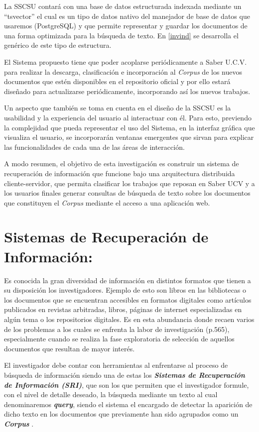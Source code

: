 \documentclass[
  10,
  spanish,
  openany]{book}
\begin{document}
La SSCSU contará con una base de datos estructurada indexada mediante un ``tsvector'' el cual es un tipo de datos nativo del manejador de base de datos que usaremos (PostgreSQL) y que permite representar y guardar los documentos de una forma optimizada para la búsqueda de texto. En \ref{invind} se desarrolla el genérico de este tipo de estructura.

El Sistema propuesto tiene que poder acoplarse periódicamente a Saber U.C.V. para realizar la descarga, clasificación e incorporación al \emph{Corpus} de los nuevos documentos que estén disponibles en el repositorio oficial y por ello estará diseñado para actualizarse periódicamente, incorporando así los nuevos trabajos.

Un aspecto que también se toma en cuenta en el diseño de la SSCSU es la usabilidad y la experiencia del usuario al interactuar con él. Para esto, previendo la complejidad que pueda representar el uso del Sistema, en la interfaz gráfica que visualiza el usuario, se incorporarán ventanas emergentes que sirvan para explicar las funcionalidades de cada una de las áreas de interacción.

A modo resumen, el objetivo de esta investigación es construir un sistema de recuperación de información que funcione bajo una arquitectura distribuida cliente-servidor, que permita clasificar los trabajos que reposan en Saber UCV y a los usuarios finales generar consultas de búsqueda de texto sobre los documentos que constituyen el \emph{Corpus} mediante el acceso a una aplicación web.

\hypertarget{intro}{%
\section{Sistemas de Recuperación de Información:}\label{intro}}

Es conocida la gran diversidad de información en distintos formatos que tienen a su disposición los investigadores. Ejemplo de esto son libros en las bibliotecas o los documentos que se encuentran accesibles en formatos digitales como artículos publicados en revistas arbitradas, libros, páginas de internet especializadas en algún tema o los repositorios digitales. Es en esta abundancia donde recaen varios de los problemas a los cuales se enfrenta la labor de investigación \citep{hernándezorallo2004} (p.565), especialmente cuando se realiza la fase exploratoria de selección de aquellos documentos que resultan de mayor interés.

El investigador debe contar con herramientas al enfrentarse al proceso de búsqueda de información siendo una de estas los \textbf{\emph{Sistemas de Recuperación de Información (SRI)}}, que son los que permiten que el investigador formule, con el nivel de detalle deseado, la búsqueda mediante un texto al cual denominaremos \textbf{\emph{query}}, siendo el sistema el encargado de detectar la aparición de dicho texto en los documentos que previamente han sido agrupados como un \textbf{\emph{Corpus}} \citep{manning2008}.
\end{document}
